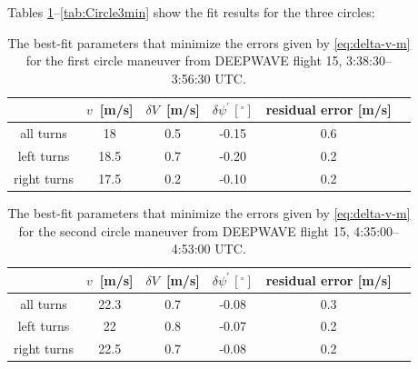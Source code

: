 \documentclass[12pt,twoside,english]{article}\usepackage[]{graphicx}\usepackage[]{color}
\providecommand{\tabularnewline}{\\}
\begin{document}
Tables \ref{tab:Circlemin}--\ref{tab:Circle3min} show the fit results for the three circles: 

\begin{center}
\begin{table}[H] 
\begin{centering}
\begin{tabular}{cccccc}
\toprule   & $v$~{[}m/s{]}  & $\delta V$~{[}m/s{]}  & $\delta\psi^{\prime}\,[^{\circ}]$  & residual error {[}m/s{]} & \tabularnewline 
\midrule 
\midrule  all turns  & 18 & 0.5 & -0.15 & 0.6\tabularnewline 
\midrule  left turns & 18.5 & 0.7 & -0.20 & 0.2\tabularnewline 
\midrule  right turns &  17.5 & 0.2 & -0.10 & 0.2\tabularnewline 
\bottomrule 
\end{tabular}
\par\end{centering}

\protect\caption{The best-fit parameters that minimize the errors given by \eqref{eq:delta-v-m} for the first circle maneuver from DEEPWAVE flight 15, 3:38:30--3:56:30 UTC.\label{tab:Circlemin}}
\end{table}

\par\end{center}



\begin{center}
\begin{table}[H] 
\begin{centering}
\begin{tabular}{cccccc}
\toprule   & $v$~{[}m/s{]}  & $\delta V$~{[}m/s{]}  & $\delta\psi^{\prime}\,[^{\circ}]$  & residual error {[}m/s{]} & \tabularnewline 
\midrule 
\midrule  all turns  & 22.3 & 0.7 & -0.08 & 0.3\tabularnewline 
\midrule  left turns & 22 & 0.8 & -0.07 & 0.2\tabularnewline 
\midrule  right turns &  22.5 & 0.7 & -0.08 & 0.2\tabularnewline 
\bottomrule 
\end{tabular}
\par\end{centering}

\protect\caption{The best-fit parameters that minimize the errors given by \eqref{eq:delta-v-m} for the second circle maneuver from DEEPWAVE flight 15, 4:35:00--4:53:00 UTC.\label{tab:Circle2min}}
\end{table}

\par\end{center}
\end{document}

